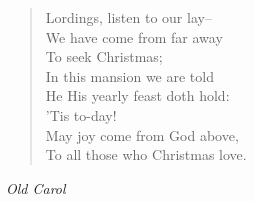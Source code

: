 
\begin{verse}
Lordings, listen to our lay--\\
We have come from far away\\
\hspace*{2em}To seek Christmas;\\
In this mansion we are told\\
He His yearly feast doth hold:\\
\hspace*{2em}'Tis to-day!\\
May joy come from God above,\\
To all those who Christmas love.%
\end{verse}

\vspace{0.5\baselineskip}
\noindent\textit{Old Carol}

\newpage
